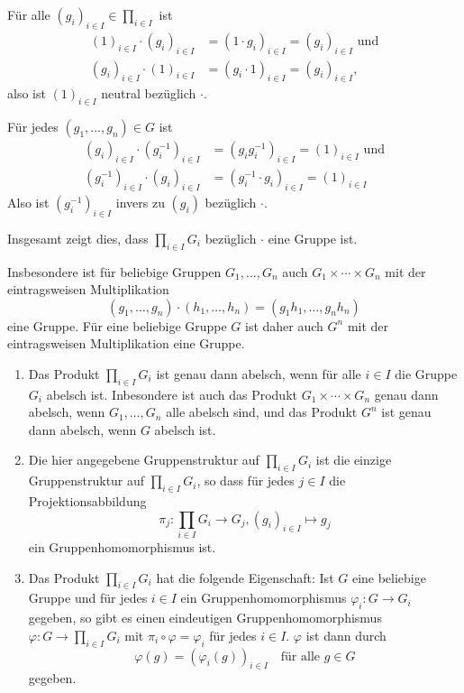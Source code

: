 Für alle $(g_i)_{i \in I} \in \prod_{i \in I}$ ist
\begin{align*}
 (1)_{i \in I} \cdot (g_i)_{i \in I}
 &= (1 \cdot g_i)_{i \in I}
 = (g_i)_{i \in I}
 \text{ und} \\
 (g_i)_{i \in I} \cdot (1)_{i \in I}
 &= (g_i \cdot 1)_{i \in I}
 = (g_i)_{i \in I},
\end{align*}
also ist $(1)_{i \in I}$ neutral bezüglich $\cdot$.

Für jedes $(g_1, \dotsc, g_n) \in G$ ist
\begin{align*}
 (g_i)_{i \in I} \cdot (g_i^{-1})_{i \in I}
 &= (g_i g_i^{-1})_{i \in I}
 = (1)_{i \in I} \text{ und} \\
 (g_i^{-1})_{i \in I} \cdot (g_i)_{i \in I}
 &= (g_i^{-1} \cdot g_i)_{i \in I}
 = (1)_{i \in I}
\end{align*}
Also ist $(g_i^{-1})_{i \in I}$ invers zu $(g_i)$ bezüglich $\cdot$.

Insgesamt zeigt dies, dass $\prod_{i \in I} G_i$ bezüglich $\cdot$ eine Gruppe ist.

Insbesondere ist für beliebige Gruppen $G_1, \dotsc, G_n$ auch $G_1 \times \dotsb \times G_n$ mit der eintragsweisen Multiplikation
\[
 (g_1, \dotsc, g_n) \cdot (h_1, \dotsc, h_n) = (g_1 h_1, \dotsc, g_n h_n)
\]
eine Gruppe. Für eine beliebige Gruppe $G$ ist daher auch $G^n$ mit der eintragsweisen Multiplikation eine Gruppe.


\begin{bem}
 \begin{enumerate}[leftmargin=*]
  \item
   Das Produkt $\prod_{i \in I} G_i$ ist genau dann abelsch, wenn für alle $i \in I$ die Gruppe $G_i$ abelsch ist. Inbesondere ist auch das Produkt $G_1 \times \dotsb \times G_n$ genau dann abelsch, wenn $G_1, \dotsc, G_n$ alle abelsch sind, und das Produkt $G^n$ ist genau dann abelsch, wenn $G$ abelsch ist.
  \item
   Die hier angegebene Gruppenstruktur auf $\prod_{i \in I} G_i$ ist die einzige Gruppenstruktur auf $\prod_{i \in I} G_i$, so dass für jedes $j \in I$ die Projektionsabbildung
   \[
    \pi_j \colon \prod_{i \in I} G_i \to G_j, (g_i)_{i \in I} \mapsto g_j
   \]
   ein Gruppenhomomorphismus ist.
  \item
   Das Produkt $\prod_{i \in I} G_i$ hat die folgende Eigenschaft: Ist $G$ eine beliebige Gruppe und für jedes $i \in I$ ein Gruppenhomomorphismus $\varphi_i \colon G \to G_i$ gegeben, so gibt es einen eindeutigen Gruppenhomomorphismus $\varphi \colon G \to \prod_{i \in I} G_i$ mit $\pi_i \circ \varphi = \varphi_i$ für jedes $i \in I$. $\varphi$ ist dann durch
   \[
    \varphi(g) = (\varphi_i(g))_{i \in I}
    \quad
    \text{für alle $g \in G$}
   \]
   gegeben.
 \end{enumerate}
\end{bem}





